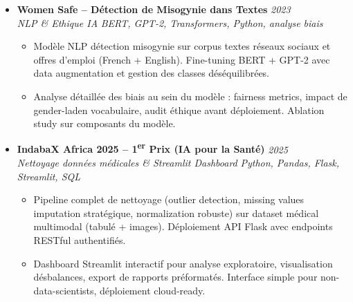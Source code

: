 \documentclass[a4paper,11pt]{article}
\begin{document}
\begin{itemize}[leftmargin=*, label={-}]
\item \textbf{Women Safe -- D\'etection de Misogynie dans Textes} \hfill \textit{2023} \\
\textit{NLP \& Ethique IA} \hfill \textit{BERT, GPT-2, Transformers, Python, analyse biais}
\vspace{-2pt}
    \begin{itemize}[leftmargin=0.4cm, nosep, label=\tiny$\bullet$]
        \item \small{Mod\`ele NLP d\'etection misogynie sur corpus textes r\'eseaux sociaux et offres d'emploi (French + English). Fine-tuning BERT + GPT-2 avec data augmentation et gestion des classes d\'es\'equilibr\'ees.}
        \item \small{Analyse d\'etaill\'ee des biais au sein du mod\`ele : fairness metrics, impact de gender-laden vocabulaire, audit \'ethique avant d\'eploiement. Ablation study sur composants du mod\`ele.}
    \end{itemize}
\vspace{3pt}

\item \textbf{IndabaX Africa 2025 -- 1\textsuperscript{er} Prix (IA pour la Sant\'e)} \hfill \textit{2025} \\
\textit{Nettoyage donn\'ees m\'edicales \& Streamlit Dashboard} \hfill \textit{Python, Pandas, Flask, Streamlit, SQL}
\vspace{-2pt}
    \begin{itemize}[leftmargin=0.4cm, nosep, label=\tiny$\bullet$]
        \item \small{Pipeline complet de nettoyage (outlier detection, missing values imputation strat\'egique, normalization robuste) sur dataset m\'edical multimodal (tabul\'e + images). D\'eploiement API Flask avec endpoints RESTful authentifi\'es.}
        \item \small{Dashboard Streamlit interactif pour analyse exploratoire, visualisation d\'esbalances, export de rapports pr\'eformat\'es. Interface simple pour non-data-scientists, d\'eploiement cloud-ready.}
    \end{itemize}
\vspace{3pt}

\end{itemize}
\end{document}
